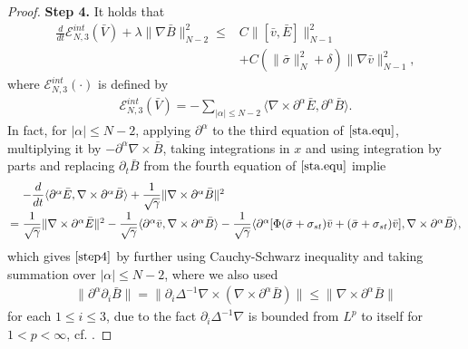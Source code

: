 \documentclass[11pt]{amsart}
\numberwithin{equation}{section}
\begin{document}
\begin{proof}
\medskip

\textbf{Step 4.} It holds that
\begin{equation}\label{step4}
\begin{aligned}
   \frac{d}{dt}\mathcal {E}_{N,3}^{int}(\bar{V})+\lambda\|\nabla\bar{B}\|^{2}_{N-2}
   \leq & C\|[\bar{v},\bar{E}]\|_{N-1}^{2}\\
   &+C(\|\bar{\sigma}\|_{N}^{2}+\delta)\|\nabla \bar{v}\|_{N-1}^{2},
\end{aligned}
\end{equation}
where $\mathcal {E}_{N,3}^{int}(\cdot)$ is defined by
\begin{eqnarray*}
\mathcal {E}_{N,3}^{int}(\bar{V})=-\sum_{|\alpha|\leq N-2}\langle
\nabla \times
\partial^{\alpha}\bar{E},\partial^{\alpha}\bar{B}\rangle.
\end{eqnarray*}
In fact, for $|\alpha|\leq N-2$, applying $\partial^{\alpha}$ to the
third equation of  $\eqref{sta.equ}$, multiplying it by
$-\partial^{\alpha}\nabla \times \bar{B}$, taking integrations in
$x$ and using integration by parts and replacing $
\partial_{t}\bar{B}$  from the fourth  equation of $\eqref{sta.equ}$
implie
\begin{equation*}
\arraycolsep=1.5pt
\begin{array}{rl}
& -\dfrac{d}{dt}\langle
\partial^{\alpha}\bar{E},\nabla \times \partial^{\alpha}\bar{B}\rangle+
\dfrac{1}{\sqrt{\gamma}}\|\nabla\times \partial^{\alpha}\bar{B}\|^{2} \\[3mm]
=&\dfrac{1}{\sqrt{\gamma}}\|\nabla\times\partial^{\alpha}\bar{E}\|^{2}-\dfrac{1}{\sqrt{\gamma}}
\langle \partial^{\alpha}\bar{v},\nabla \times
\partial^{\alpha}\bar{B}\rangle
-\dfrac{1}{\sqrt{\gamma}}\langle
\partial^{\alpha}[\Phi(\bar{\sigma}+\sigma_{st})\bar{v}+(\bar{\sigma}+\sigma_{st})\bar{v}],\nabla \times
\partial^{\alpha}\bar{B}\rangle,
\end{array}
\end{equation*}
which gives $\eqref{step4}$ by further using Cauchy-Schwarz
inequality and taking summation over $|\alpha|\leq N-2$, where we
also used
\begin{eqnarray*}
\|\partial^{\alpha}\partial_{i}\bar{B}\|=\|\partial_{i}\Delta^{-1}\nabla
\times(\nabla\times\partial^{\alpha}\bar{B}) \|\leq\|\nabla\times
\partial^{\alpha}\bar{B}\|
\end{eqnarray*}
for each $1\leq i\leq 3$, due to the fact
$\partial_{i}\Delta^{-1}\nabla$ is bounded from $L^{p}$ to itself
for $1<p<\infty$, cf. \cite{Stein}.

\medskip


\end{proof}
\end{document}
